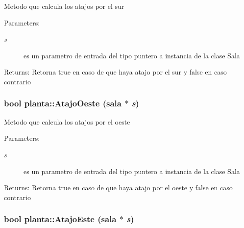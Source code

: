 Metodo que calcula los atajos por el sur \begin{Desc}
\item[Parameters:]
\begin{description}
\item[{\em s}]es un parametro de entrada del tipo puntero a instancia de la clase Sala \end{description}
\end{Desc}
\begin{Desc}
\item[Returns:]Retorna true en caso de que haya atajo por el sur y false en caso contrario \end{Desc}
\hypertarget{classplanta_289d62512ce27210c8d2b065c2e1ad7f}{
\subsubsection[AtajoOeste]{\setlength{\rightskip}{0pt plus 5cm}bool planta::AtajoOeste ({\bf sala} $\ast$ {\em s})}}
\label{classplanta_289d62512ce27210c8d2b065c2e1ad7f}


Metodo que calcula los atajos por el oeste \begin{Desc}
\item[Parameters:]
\begin{description}
\item[{\em s}]es un parametro de entrada del tipo puntero a instancia de la clase Sala \end{description}
\end{Desc}
\begin{Desc}
\item[Returns:]Retorna true en caso de que haya atajo por el oeste y false en caso contrario \end{Desc}
\hypertarget{classplanta_9de280e30bde3f6acd5f758567f39ad6}{
\subsubsection[AtajoEste]{\setlength{\rightskip}{0pt plus 5cm}bool planta::AtajoEste ({\bf sala} $\ast$ {\em s})}}
\label{classplanta_9de280e30bde3f6acd5f758567f39ad6}


